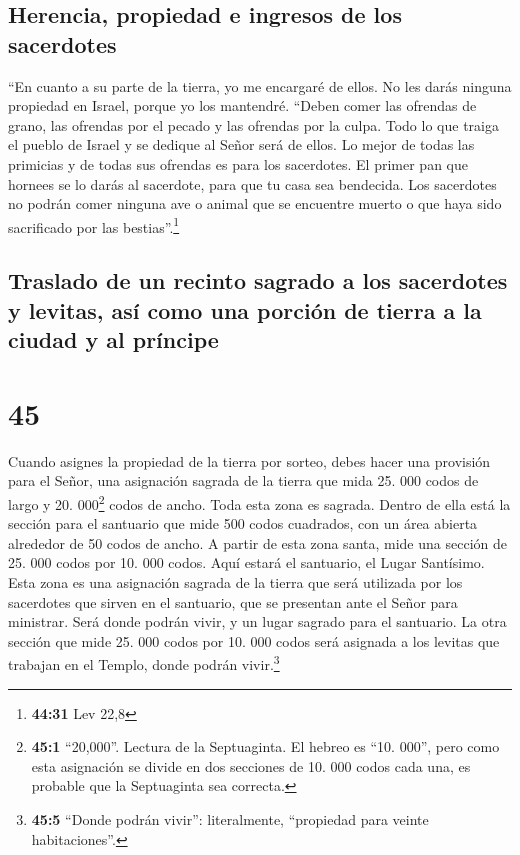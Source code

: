 \hypertarget{herencia-propiedad-e-ingresos-de-los-sacerdotes}{%
\subsection{Herencia, propiedad e ingresos de los
sacerdotes}\label{herencia-propiedad-e-ingresos-de-los-sacerdotes}}

 ``En cuanto a su parte de la tierra, yo me encargaré de
ellos. No les darás ninguna propiedad en Israel, porque yo los
mantendré.  ``Deben comer las ofrendas de grano, las
ofrendas por el pecado y las ofrendas por la culpa. Todo lo que traiga
el pueblo de Israel y se dedique al Señor será de ellos. 
Lo mejor de todas las primicias y de todas sus ofrendas es para los
sacerdotes. El primer pan que hornees se lo darás al sacerdote, para que
tu casa sea bendecida.  Los sacerdotes no podrán comer
ninguna ave o animal que se encuentre muerto o que haya sido sacrificado
por las bestias''.\footnote{\textbf{44:31} Lev 22,8}

\hypertarget{traslado-de-un-recinto-sagrado-a-los-sacerdotes-y-levitas-asuxed-como-una-porciuxf3n-de-tierra-a-la-ciudad-y-al-pruxedncipe}{%
\subsection{Traslado de un recinto sagrado a los sacerdotes y levitas,
así como una porción de tierra a la ciudad y al
príncipe}\label{traslado-de-un-recinto-sagrado-a-los-sacerdotes-y-levitas-asuxed-como-una-porciuxf3n-de-tierra-a-la-ciudad-y-al-pruxedncipe}}

\hypertarget{section-44}{%
\section{45}\label{section-44}}

 Cuando asignes la propiedad de la tierra por sorteo,
debes hacer una provisión para el Señor, una asignación sagrada de la
tierra que mida 25. 000 codos de largo y 20. 000\footnote{\textbf{45:1}
  ``20,000''. Lectura de la Septuaginta. El hebreo es ``10. 000'', pero
  como esta asignación se divide en dos secciones de 10. 000 codos cada
  una, es probable que la Septuaginta sea correcta.} codos de ancho.
Toda esta zona es sagrada.  Dentro de ella está la sección
para el santuario que mide 500 codos cuadrados, con un área abierta
alrededor de 50 codos de ancho.  A partir de esta zona
santa, mide una sección de 25. 000 codos por 10. 000 codos. Aquí estará
el santuario, el Lugar Santísimo.  Esta zona es una
asignación sagrada de la tierra que será utilizada por los sacerdotes
que sirven en el santuario, que se presentan ante el Señor para
ministrar. Será donde podrán vivir, y un lugar sagrado para el
santuario.  La otra sección que mide 25. 000 codos por 10.
000 codos será asignada a los levitas que trabajan en el Templo, donde
podrán vivir.\footnote{\textbf{45:5} ``Donde podrán vivir'':
  literalmente, ``propiedad para veinte habitaciones''.}

